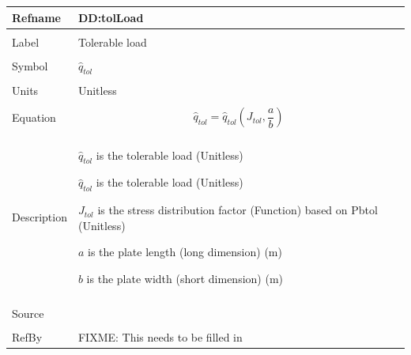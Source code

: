 \documentclass[12pt]{article}
\begin{document}
\noindent \begin{minipage}{\textwidth}
\begin{tabular}{p{} p{}}
\toprule \textbf{Refname} & \textbf{DD:tolLoad}
\label{DD:tolLoad}
\\ \midrule \\
Label & Tolerable load
\\ \midrule \\
Symbol & ${\hat{q}_{tol}}$
\\ \midrule \\
Units & Unitless
\\ \midrule \\
Equation & \begin{dmath}
           {\hat{q}_{tol}}={\hat{q}_{tol}}\left({J_{tol}},\frac{a}{b}\right)
           \end{dmath}
\\ \midrule \\
Description & \begin{description}
              \item{${\hat{q}_{tol}}$ is the tolerable load (Unitless)}
              \item{${\hat{q}_{tol}}$ is the tolerable load (Unitless)}
              \item{${J_{tol}}$ is the stress distribution factor (Function) based on Pbtol (Unitless)}
              \item{$a$ is the plate length (long dimension) (m)}
              \item{$b$ is the plate width (short dimension) (m)}
              \end{description}
\\ \midrule \\
Source & 
\\ \midrule \\
RefBy & FIXME: This needs to be filled in
\\ \bottomrule \end{tabular}
\end{minipage}\\
~\newline
\end{document}
